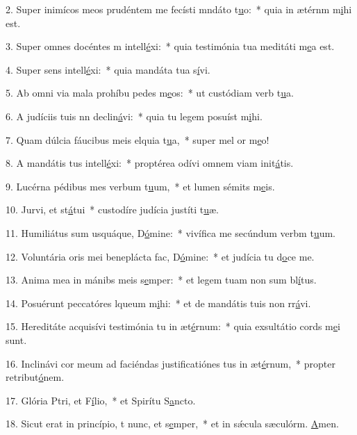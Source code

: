 2. Super inimícos meos prudéntem me fecísti mndáto t\uline{u}o:~* quia in ætérnm m\uline{i}hi est.\par 
3. Super omnes docéntes m intell\uline{é}xi:~* quia testimónia tua meditáti m\uline{e}a est.\par 
4. Super sens intell\uline{é}xi:~* quia mandáta tua s\uline{í}vi.\par 
5. Ab omni via mala prohíbu pedes m\uline{e}os:~* ut custódiam verb t\uline{u}a.\par 
6. A judíciis tuis nn declin\uline{á}vi:~* quia tu legem posuíst m\uline{i}hi.\par 
7. Quam dúlcia fáucibus meis elquia t\uline{u}a,~* super mel or m\uline{e}o!\par 
8. A mandátis tus intell\uline{é}xi:~* proptérea odívi omnem viam init\uline{á}tis.\par 
9. Lucérna pédibus mes verbum t\uline{u}um,~* et lumen sémits m\uline{e}is.\par 
10. Jurvi, et st\uline{á}tui~* custodíre judícia justíti t\uline{u}æ.\par 
11. Humiliátus sum usquáque, D\uline{ó}mine:~* vivífica me secúndum verbm t\uline{u}um.\par 
12. Voluntária oris mei beneplácta fac, D\uline{ó}mine:~* et judícia tu d\uline{o}ce me.\par 
13. Anima mea in mánibs meis s\uline{e}mper:~* et legem tuam non sum bl\uline{í}tus.\par 
14. Posuérunt peccatóres lqueum m\uline{i}hi:~* et de mandátis tuis non rr\uline{á}vi.\par 
15. Hereditáte acquisívi testimónia tu in æt\uline{é}rnum:~* quia exsultátio cords m\uline{e}i sunt.\par 
16. Inclinávi cor meum ad faciéndas justificatiónes tus in æt\uline{é}rnum,~* propter retribut\uline{ó}nem.\par 
17. Glória Ptri, et F\uline{í}lio,~* et Spirítu S\uline{a}ncto.\par 
18. Sicut erat in princípio, t nunc, et s\uline{e}mper,~* et in sǽcula sæculórm. \uline{A}men.\par 

